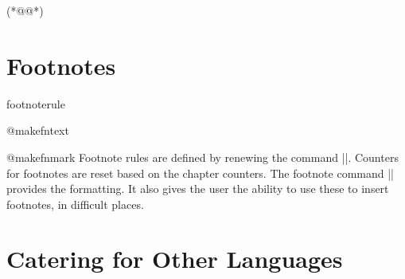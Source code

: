 \begin{teX}
\newenvironment{theindex}
   {\if@twocolumn
      \@restonecolfalse
      \else
         \@restonecoltrue
      \fi
      \twocolumn[\@makeschapterhead{\indexname}]%
      \@mkboth{\MakeUppercase\indexname}%
              {\MakeUppercase\indexname}%
                \thispagestyle{plain}\parindent\z@
                \parskip\z@ \@plus .3\p@\relax
                \columnseprule \z@
                \columnsep 35\p@
                \let\item\@idxitem}
      {\if@restonecol\onecolumn\else\clearpage\fi}
\newcommand\@idxitem{\par\hangindent 40\p@} (*@\label{idxitem}@*)
\newcommand\subitem{\@idxitem \hspace*{20\p@}}
\newcommand\subsubitem{\@idxitem \hspace*{30\p@}}
\newcommand\indexspace{\par \vskip 10\p@ \@plus5\p@ \@minus3\p@\relax}
\end{teX}

\section{Footnotes}
\label{book:footnotes}

\begin{docCommand}{footnoterule}{}
\begin{docCommand}{@makefntext}{}
\begin{docCommand}{@makefnmark}{}
 Footnote rules are defined by renewing the command |\footnoterule|. Counters for footnotes are reset based on the chapter counters. The footnote command |\@makefntext| provides the formatting. It also gives the user the ability to use these to insert footnotes, in difficult places.
\end{docCommand}
\end{docCommand}
\end{docCommand}

\begin{teX}
\renewcommand\footnoterule{%
  \kern-3\p@
  \hrule\@width.4\columnwidth 
  \kern2.6\p@}


\newcommand\@makefntext[1]{%
    \parindent 1em%
    \noindent
    \hb@xt@1.8em{\hss\@makefnmark}#1}
\end{teX}

\section*{Catering for Other Languages}

